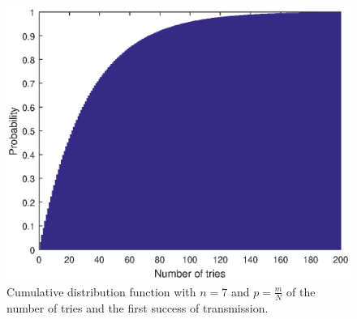 		\begin{figure}
			\centering
			\includegraphics[width=\textwidth]{chapters/cdf-n=7-p=m_over_N_num_of_tries.eps}
			\caption{Cumulative distribution function with $n = 7$ and $p = \frac{m}{N}$ of the number of tries and the first success of transmission.}
			\label{fig:cdf-n=7-num-of-tries}
		\end{figure}







